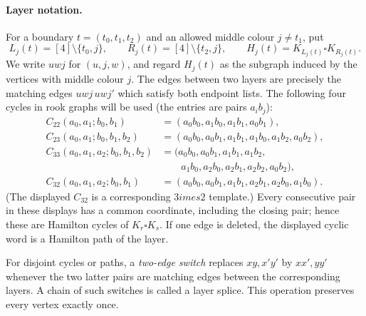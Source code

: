 
\paragraph{Layer notation.}
For a boundary $t=(t_0,t_1,t_2)$ and an allowed middle colour $j\ne t_1$, put
\[
 L_j(t)=[4]\setminus\{t_0,j\},\qquad
 R_j(t)=[4]\setminus\{t_2,j\},\qquad
 H_j(t)=K_{L_j(t)}\square K_{R_j(t)}.
\]
We write $uwj$ for $(u,j,w)$, and regard $H_j(t)$ as the subgraph induced
by the vertices with middle colour $j$.  The edges between two layers are
precisely the matching edges $uwj\,uwj'$ which satisfy both endpoint lists.
The following four cycles in rook graphs will be used (the entries are
pairs $a_ib_j$):
\begin{align*}
 C_{22}(a_0,a_1;b_0,b_1)&=(a_0b_0,a_1b_0,a_1b_1,a_0b_1),\\
 C_{23}(a_0,a_1;b_0,b_1,b_2)&=(a_0b_0,a_0b_1,a_1b_1,a_1b_0,a_1b_2,a_0b_2),\\
 C_{33}(a_0,a_1,a_2;b_0,b_1,b_2)&=(a_0b_0,a_0b_1,a_1b_1,a_1b_2,\\
 &\qquad a_1b_0,a_2b_0,a_2b_1,a_2b_2,a_0b_2),\\
 C_{32}(a_0,a_1,a_2;b_0,b_1)&=(a_0b_0,a_0b_1,a_1b_1,a_2b_1,a_2b_0,a_1b_0).
\end{align*}
(The displayed $C_{32}$ is a corresponding $3	imes2$ template.)
Every consecutive pair in these displays has a common
coordinate, including the closing pair; hence these are Hamilton cycles of
$K_r\square K_s$.  If one edge is deleted, the displayed cyclic word is a
Hamilton path of the layer.

For disjoint cycles or paths, a \emph{two-edge switch} replaces
$xy,x'y'$ by $xx',yy'$ whenever the two latter pairs are matching edges
between the corresponding layers.  A chain of such switches is called a
layer splice.  This operation preserves every vertex exactly once.

